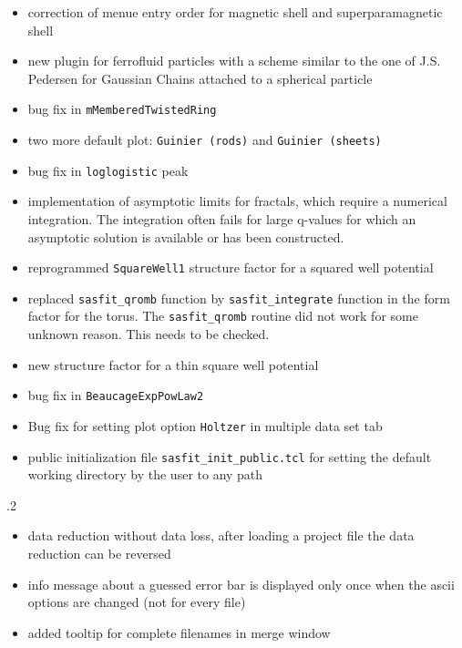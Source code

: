 \begin{description}
\begin{itemize}
              (tetrahedron like)
        \item correction of menue entry order for magnetic shell and
              superparamagnetic shell
        \item new plugin for ferrofluid particles with a scheme similar to
              the one of J.S. Pedersen for Gaussian Chains attached to a spherical particle
        \item bug fix in \texttt{mMemberedTwistedRing}
        \item two more default plot: \texttt{Guinier (rods)} and \texttt{Guinier (sheets)}
        \item bug fix in \texttt{loglogistic} peak
        \item implementation of asymptotic limits for fractals, which require a
              numerical integration. The integration often fails for large q-values
              for which an asymptotic solution is available or has been constructed.
        \item reprogrammed \texttt{SquareWell1} structure factor for a squared well potential
        \item replaced \texttt{sasfit\_qromb} function by \texttt{sasfit\_integrate} function in the
              form factor for the torus. The \texttt{sasfit\_qromb} routine did not work for some
              unknown reason. This needs to be checked.
        \item new structure factor for a thin square well potential
        \item bug fix in \texttt{BeaucageExpPowLaw2}
        \item Bug fix for setting plot option
              \texttt{Holtzer} in multiple data set tab
        \item public initialization file \texttt{sasfit\_init\_public.tcl} for setting
              the default working directory by the user to any path
        \end{itemize}
    \item[2009-10-08] .2
        \begin{itemize}
          \item data reduction without data loss, after loading a project file the data reduction can be reversed
          \item info message about a guessed error bar is displayed only once when the ascii options are changed
                (not for every file)
          \item added tooltip for complete filenames in merge window

\end{itemize}
\end{description}
